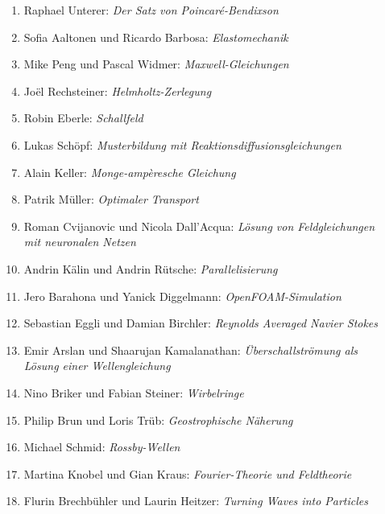 \documentclass[handout]{beamer}
\begin{document}
\begin{frame}
\begin{columns}[t,onlytextwidth]
\begin{column}{0.60\textwidth}
\begin{description}
\begin{enumerate}
\item Raphael Unterer: {\em Der Satz von Poincaré-Bendixson}
\item Sofia Aaltonen und Ricardo Barbosa: {\em Elastomechanik}
\item Mike Peng und Pascal Widmer: {\em Maxwell-Gleichungen}
\setcounter{enumi}{19}
\item Joël Rechsteiner: {\em Helmholtz-Zerlegung}
\item Robin Eberle: {\em Schallfeld}
\item Lukas Schöpf: {\em Musterbildung mit Reaktionsdiffusionsgleichungen}
\item Alain Keller: {\em Monge-ampèresche Gleichung}
\item Patrik Müller: {\em Optimaler Transport}
\item Roman Cvijanovic und Nicola Dall'Acqua:
{\em Lösung von Feldgleichungen mit neuronalen Netzen}
\item Andrin Kälin und Andrin Rütsche: {\em Parallelisierung}
\item Jero Barahona und Yanick Diggelmann: {\em OpenFOAM-Simulation}
\item Sebastian Eggli und Damian Birchler: {\em Reynolds Averaged Navier Stokes}
\item Emir Arslan und Shaarujan Kamalanathan:
{\em Überschallströmung als Lösung einer Wellengleichung}
\item Nino Briker und Fabian Steiner: {\em Wirbelringe}
\item Philip Brun und Loris Trüb: {\em Geostrophische Näherung}
\item Michael Schmid: {\em Rossby-Wellen}
\item Martina Knobel und Gian Kraus: {\em Fourier-Theorie und Feldtheorie}
\item Flurin Brechbühler und Laurin Heitzer: {\em Turning Waves into Particles}
\end{enumerate}
\end{description}
\end{column}
\begin{column}{0.01\textwidth}
\end{column}
\end{columns}
\end{frame}
\end{document}
